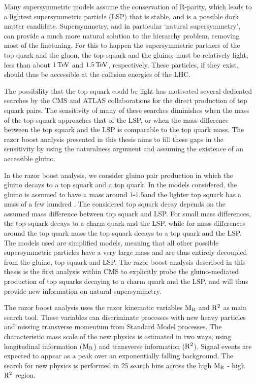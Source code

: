 Many supersymmetric models assume the conservation of R-parity, which leads to a lightest
supersymmetric particle (LSP) that is stable, and is a possible dark matter candidate. 
Supersymmetry, and in particular `natural supersymmetry', can provide a much more natural solution
to the hierarchy problem, removing most of the finetuning. For this to happen the supersymmetric
partners of the top quark and the gluon, the top squark and the gluino, must be relatively light,
less than about $1\,\text{Te\hspace{-.08em}V}$ and $1.5\,\text{Te\hspace{-.08em}V}$, respectively. These particles, if they exist, should thus be
accessible at the collision energies of the LHC. 


The possibility that the top squark could be light has motivated several dedicated searches by the
CMS and ATLAS collaborations for the direct production of top squark pairs. 
The sensitivity of many of these searches diminishes when the mass of the top squark approaches that
of the LSP, or when the mass difference between the top squark and the LSP is comparable to the top
quark mass. The razor boost analysis presented in this thesis aims to fill these gaps in the
sensitivity by using the naturalness argument and assuming the existence of an accessible gluino. 


In the razor boost analysis, we consider gluino pair production in which the gluino decays to a top
squark and a top quark. In the models considered, the gluino is assumed to have a mass around
1-1.5\TeV and the lighter top squark has a mass of a few hundred \GeV.
The considered top squark decay depends on the assumed mass difference between top squark and LSP.
For small mass differences, the top squark decays to a charm quark and the LSP, while for mass
differences around the top quark mass the top squark decays to a top quark and the LSP. 
The models used are simplified models, meaning that all other possible supersymmetric particles
have a very large mass and are thus entirely decoupled from the gluino, top squark and LSP. 
The razor boost analysis described in this thesis is the first analysis within CMS to explicitly
probe the gluino-mediated production of top squarks decaying to a charm quark and the LSP, and
will thus provide new information on natural supersymmetry. 


The razor boost analysis uses the razor kinematic variables $\mathrm{M_R}$ and $\mathrm{R^2}$ as main search tool.
These variables can discriminate processes with new heavy particles and missing transverse
momentum from Standard Model processes. The characteristic mass scale of the new physics is
estimated in two ways, using longitudinal information ($\mathrm{M_R}$) and transverse information ($\mathrm{R^2}$). 
Signal events are expected to appear as a peak over an exponentially falling background. 
The search for new physics is performed in 25 search bins across the high $\mathrm{M_R}$ - high $\mathrm{R^2}$
region. 

